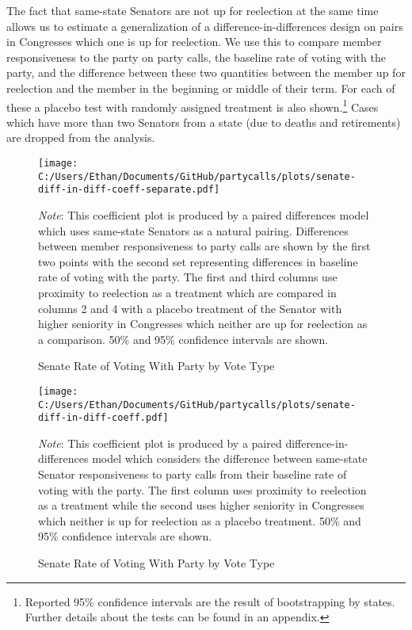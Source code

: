 \documentclass[12pt]{article}
\newcommand\fnote[1]{\captionsetup{font=small}\caption*{#1}}
\begin{document}
The fact that same-state Senators are not up for reelection at the same time allows us to estimate a generalization of a difference-in-differences design on pairs in Congresses which one is up for reelection. We use this to compare member responsiveness to the party on party calls, the baseline rate of voting with the party, and the difference between these two quantities between the member up for reelection and the member in the beginning or middle of their term. For each of these a placebo test with randomly assigned treatment is also shown.\footnote{Reported 95\% confidence intervals are the result of bootstrapping by states. Further details about the tests can be found in an appendix.} Cases which have more than two Senators from a state (due to deaths and retirements) are dropped from the analysis.

\begin{figure}[H]
	\centering
	\caption{Senate Rate of Voting With Party by Vote Type}
	\texttt{[image: C:/Users/Ethan/Documents/GitHub/partycalls/plots/senate-diff-in-diff-coeff-separate.pdf]}
	\fnote{\textit{Note}: This coefficient plot is produced by a paired differences model which uses same-state Senators as a natural pairing. Differences between member responsiveness to party calls are shown by the first two points with the second set representing differences in baseline rate of voting with the party. The first and third columns use proximity to reelection as a treatment which are compared in columns 2 and 4 with a placebo treatment of the Senator with higher seniority in Congresses which neither are up for reelection as a comparison. 50\% and 95\% confidence intervals are shown.}
\end{figure}

\begin{figure}[H]
	\centering
	\caption{Senate Rate of Voting With Party by Vote Type}
	\texttt{[image: C:/Users/Ethan/Documents/GitHub/partycalls/plots/senate-diff-in-diff-coeff.pdf]}
	\fnote{\textit{Note}: This coefficient plot is produced by a paired difference-in-differences model which considers the difference between same-state Senator responsiveness to party calls from their baseline rate of voting with the party. The first column uses proximity to reelection as a treatment while the second uses higher seniority in Congresses which neither is up for reelection as a placebo treatment. 50\% and 95\% confidence intervals are shown.}
\end{figure}
\end{document}
